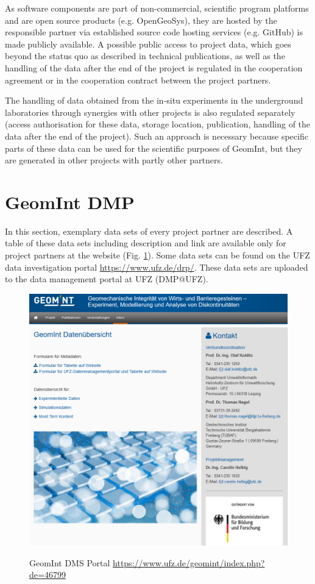 As software components are part of non-commercial, scientific program platforms and are open source products (e.g. OpenGeoSys), they are hosted by the responsible partner via established source code hosting services (e.g. GitHub) is made publicly available. A possible public access to project data, which goes beyond the status quo as described in technical publications, as well as the handling of the data after the end of the project is regulated in the cooperation agreement or in the cooperation contract between the project partners. 

The handling of data obtained from the in-situ experiments in the underground laboratories through synergies with other projects is also regulated separately (access authorisation for these data, storage location, publication, handling of the data after the end of the project). Such an approach is necessary because specific parts of these data can be used for the scientific purposes of GeomInt, but they are generated in other projects with partly other partners.

\section{GeomInt DMP}

In this section, exemplary data sets of every project partner are described. A table of these data sets including description and link are available only for project partners at the website (Fig. \ref{fig:geomint-dms-web}). Some data sets can be found on the UFZ data investigation portal \url{https://www.ufz.de/drp/}. These data sets are uploaded to the data management portal at UFZ (DMP@UFZ).

\begin{figure}[!ht]
\includegraphics[width=\textwidth]{figures/geomint-web-01.png}
\includegraphics[width=\textwidth]{figures/geomint-dms-01.png}
\caption{GeomInt DMS Portal \url{https://www.ufz.de/geomint/index.php?de=46799}}
\label{fig:geomint-dms-web}
\end{figure}

